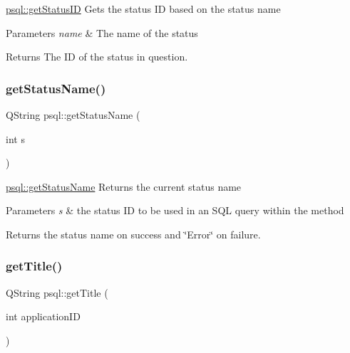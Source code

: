 \hyperlink{classpsql_a9c02c92c09cb60c35d24375673b7df06}{psql\+::get\+Status\+ID} Gets the status ID based on the status name 


\begin{DoxyParams}{Parameters}
{\em name} & The name of the status \\
\hline
\end{DoxyParams}
\begin{DoxyReturn}{Returns}
The ID of the status in question. 
\end{DoxyReturn}
\mbox{\label{classpsql_a5c2a64419a68a258071fd1f9a37c7c09}} 
\subsubsection{\texorpdfstring{get\+Status\+Name()}{getStatusName()}}
{\footnotesize\ttfamily Q\+String psql\+::get\+Status\+Name (\begin{DoxyParamCaption}\item[{int}]{s }\end{DoxyParamCaption})}



\hyperlink{classpsql_a5c2a64419a68a258071fd1f9a37c7c09}{psql\+::get\+Status\+Name} Returns the current status name 


\begin{DoxyParams}{Parameters}
{\em s} & the status ID to be used in an S\+QL query within the method \\
\hline
\end{DoxyParams}
\begin{DoxyReturn}{Returns}
the status name on success and \char`\"{}\+Error\char`\"{} on failure. 
\end{DoxyReturn}
\mbox{\label{classpsql_ada9e3be3e0866011edf53e30ec510afc}} 
\subsubsection{\texorpdfstring{get\+Title()}{getTitle()}}
{\footnotesize\ttfamily Q\+String psql\+::get\+Title (\begin{DoxyParamCaption}\item[{int}]{application\+ID }\end{DoxyParamCaption})}




